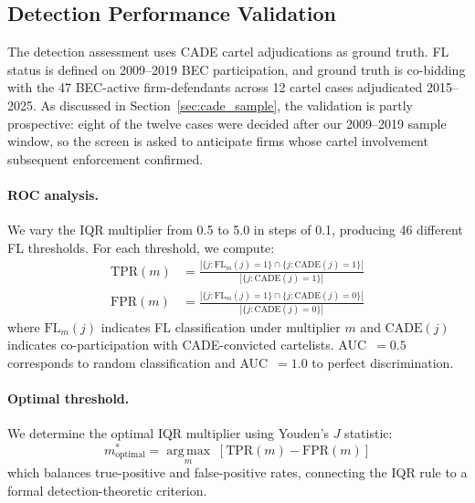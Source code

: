 
\subsection{Detection Performance Validation}
\label{sec:detection_validation}

The detection assessment uses CADE cartel adjudications as ground
truth. FL status is defined on 2009--2019 BEC participation, and
ground truth is co-bidding with the 47 BEC-active firm-defendants
across 12 cartel cases adjudicated 2015--2025. As discussed in
Section~\ref{sec:cade_sample}, the validation is partly prospective:
eight of the twelve cases were decided after our 2009--2019 sample
window, so the screen is asked to anticipate firms whose cartel
involvement subsequent enforcement confirmed.

\paragraph{ROC analysis.}
We vary the IQR multiplier from 0.5 to 5.0 in steps of 0.1, producing
46 different FL thresholds. For each threshold, we compute:
\begin{align}
  \text{TPR}(m) &= \frac{|\{j : \text{FL}_m(j)=1\} \cap
    \{j : \text{CADE}(j)=1\}|}{|\{j : \text{CADE}(j)=1\}|}
  \label{eq:tpr} \\
  \text{FPR}(m) &= \frac{|\{j : \text{FL}_m(j)=1\} \cap
    \{j : \text{CADE}(j)=0\}|}{|\{j : \text{CADE}(j)=0\}|}
  \label{eq:fpr}
\end{align}
where $\text{FL}_m(j)$ indicates FL classification under multiplier $m$
and $\text{CADE}(j)$ indicates co-participation with CADE-convicted
cartelists. AUC~$= 0.5$ corresponds to random classification and
AUC~$= 1.0$ to perfect discrimination.

\paragraph{Optimal threshold.}
We determine the optimal IQR multiplier using Youden's $J$
statistic:
\begin{equation}
  m^*_{\text{optimal}} = \operatorname*{arg\,max}_m \;
  \left[\text{TPR}(m) - \text{FPR}(m)\right]
  \label{eq:youden}
\end{equation}
which balances true-positive and false-positive rates, connecting the
IQR rule to a formal detection-theoretic criterion.

